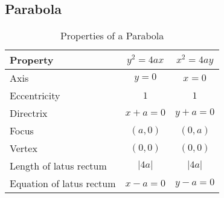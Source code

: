 \documentclass[../main.tex]{subfile}
\begin{document}
    \subsection{Parabola}
        \begin{table}[h!]
        \caption{Properties of a Parabola}
        \label{parabola}
            \begin{center}
                \begin{tabular}{l|c|c}
                    Property&$y^2=4ax$&$x^2=4ay$\\
                    \hline
                    Axis&$y=0$&$x=0$\\
                    Eccentricity&$1$&$1$\\
                    Directrix&$x+a=0$&$y+a=0$\\
                    Focus&$(a,0)$&$(0,a)$\\
                    Vertex&$(0,0)$&$(0,0)$\\
                    Length of latus rectum&$\lvert 4a \rvert$&$\lvert 4a \rvert$\\
                    Equation of latus rectum&$x-a=0$&$y-a=0$\\
                \end{tabular}
            \end{center}
        \end{table}

    \newpage
    
\end{document}
